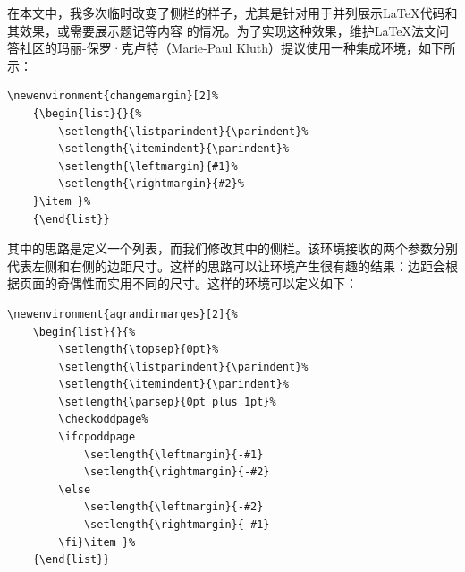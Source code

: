 在本文中，我多次临时改变了侧栏的样子，尤其是针对用于并列展示\LaTeX 代码和其效果，或需要展示题记等内容%
的情况。为了实现这种效果，维护\LaTeX 法文问答社区的玛丽-保罗·克卢特（Marie-Paul Kluth）提议使用一种集成环境，如下所示：

\begin{dmd}
\begin{verbatim}
\newenvironment{changemargin}[2]% 
    {\begin{list}{}{%
        \setlength{\listparindent}{\parindent}% 
        \setlength{\itemindent}{\parindent}% 
        \setlength{\leftmargin}{#1}% 
        \setlength{\rightmargin}{#2}%
    }\item }% 
    {\end{list}}\end{verbatim}
\end{dmd}

其中的思路是定义一个列表，而我们修改其中的侧栏。该环境接收的两个参数分别代表左侧和右侧的边距尺寸。这样的思路可以让环境产生很有趣的结果：边距会根据页面的奇偶性而实用不同的尺寸。这样的环境可以定义如下：

\begin{dmd}
\begin{verbatim}
\newenvironment{agrandirmarges}[2]{% 
    \begin{list}{}{%
        \setlength{\topsep}{0pt}% 
        \setlength{\listparindent}{\parindent}% 
        \setlength{\itemindent}{\parindent}% 
        \setlength{\parsep}{0pt plus 1pt}% 
        \checkoddpage%
        \ifcpoddpage
            \setlength{\leftmargin}{-#1}
            \setlength{\rightmargin}{-#2}
        \else
            \setlength{\leftmargin}{-#2}
            \setlength{\rightmargin}{-#1}
        \fi}\item }% 
    {\end{list}}\end{verbatim}
\end{dmd}

\newenvironment{agrandirmarges}[2]{%
    \begin{list}{}{%
        \setlength{\topsep}{0pt}%
        \setlength{\listparindent}{\parindent}%
        \setlength{\itemindent}{\parindent}%
        \setlength{\parsep}{0pt plus 1pt}%
        \checkoddpage%
        \ifcpoddpage
            \setlength{\leftmargin}{-#1}
            \setlength{\rightmargin}{-#2}
        \else
            \setlength{\leftmargin}{-#2}
            \setlength{\rightmargin}{-#1}
        \fi}\item }%
    {\end{list}}

